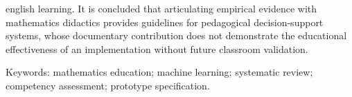 \begin{resumo}[Abstract]
\begin{otherlanguage*}{english}
learning. It is concluded that articulating empirical evidence with mathematics didactics provides guidelines for pedagogical decision-support systems, whose documentary contribution does not demonstrate the educational effectiveness of an implementation without future classroom validation.

\vspace{0.2cm}
Keywords: mathematics education; machine learning; systematic review; competency assessment; prototype specification.
\end{otherlanguage*}
\end{resumo}
